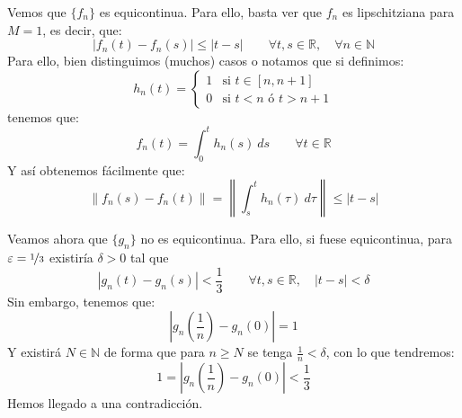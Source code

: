 \begin{ejemplo}
    \noindent
    Vemos que $\{f_n\}$ es equicontinua. Para ello, basta ver que $f_n$ es lipschitziana para $M=1$, es decir, que:
    \begin{equation*}
        |f_n(t)-f_n(s)| \leq |t-s| \qquad \forall t,s\in \mathbb{R}, \quad \forall n\in \mathbb{N}
    \end{equation*}
    Para ello, bien distinguimos (muchos) casos o notamos que si definimos:
    \begin{equation*}
        h_n(t) = \left\{\begin{array}{ll}
                1 & \text{si\ } t\in [n,n+1] \\
            0 & \text{si\ } t<n \text{\ ó\ } t > n+1
        \end{array}\right. 
    \end{equation*}
    tenemos que:
    \begin{equation*}
        f_n(t) = \int_{0}^{t} h_n(s)~ds  \qquad \forall t\in \mathbb{R}
    \end{equation*}
    Y así obtenemos fácilmente que:
    \begin{equation*}
        \|f_n(s) - f_n(t) \| = \left\|\int_{s}^{t} h_n(\tau)~d\tau \right\| \leq |t-s|
    \end{equation*}

    \noindent
    Veamos ahora que $\{g_n\}$ no es equicontinua. Para ello, si fuese equicontinua, para $\varepsilon=\nicefrac{1}{3}$ existiría $\delta>0$ tal que
    \begin{equation*}
        |g_n(t) - g_n(s)| < \frac{1}{3}\qquad \forall t,s\in \mathbb{R}, \quad |t-s| < \delta
    \end{equation*}
    Sin embargo, tenemos que:
    \begin{equation*}
        \left|g_n\left(\frac{1}{n}\right)-g_n(0)\right| = 1
    \end{equation*}
    Y existirá $N\in \mathbb{N}$ de forma que para $n\geq N$ se tenga $\frac{1}{n}<\delta$, con lo que tendremos:
    \begin{equation*}
        1 = \left|g_n\left(\frac{1}{n}\right)-g_n(0)\right| < \frac{1}{3}
    \end{equation*}
    Hemos llegado a una contradicción.
\end{ejemplo}

